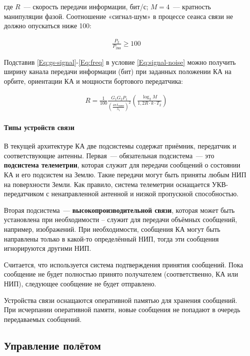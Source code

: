 \documentclass[12pt,a4paper]{article}
\begin{document}
где $R$~--– скорость передачи информации, бит/с; $M = 4$~--– кратность манипуляции фазой.
Соотношение «сигнал-шум» в процессе сеанса связи не должно опускаться ниже 100:

\begin{eqnarray}
\frac{P_{2}}{P_{2\text{Ш}}} \geqslant 100 \label{Eq:signal-noise}
\end{eqnarray}

Подставив \ref{Eq:gs-signal}-\ref{Eq:freq} в условие \ref{Eq:signal-noise} можно получить
ширину канала передачи информации (бит) при заданных положении КА на орбите, ориентации КА
и мощности бортового передатчика:

\begin{eqnarray}
R = \frac{1}{100} \frac{G_1 G_2 P_1}{\left( \frac{4 \pi L_{\text{НИП}}}{\lambda_1}
  \right)^2} \left( \frac{\log_2{M}}{1,2 R \cdot k \cdot T_2} \right)
\end{eqnarray}

\paragraph{Типы устройств связи}

В текущей архитектуре КА две подсистемы содержат приёмник, передатчик и соответствующие
антенны. Первая~--- обязательная подсистема~--- это \textbf{подсистема телеметрии},
которая служит для передачи сообщений о состоянии КА и его подсистем на Землю. Такие
передачи могут быть приняты любым НИП на поверхности Земли. Как правило, система
телеметрии оснащается УКВ-передатчиком с ненаправленной антенной и низкой пропускной
способностью.

Вторая подсистема~--- \textbf{высокопроизводительной связи}, которая может быть
установлена при необходимости – служит для передачи объёмных сообщений, например,
изображений. При необходимости, сообщения КА могут быть направлены только в какой-то
определённый НИП, тогда эти сообщения игнорируются другими НИП.

Считается, что используется система подтверждения принятия сообщений. Пока сообщение не
будет полностью принято получателем (соответственно, КА или НИП), следующее сообщение не
будет отправлено.

Устройства связи оснащаются оперативной памятью для хранения сообщений. При исчерпании
оперативной памяти, новые сообщения не попадают в очередь передаваемых сообщений.

\subsection{Управление полётом}
\label{Sec:CPU}
\end{document}
